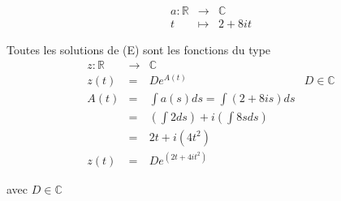 \[\begin{array}{rcl}
	a : \mathbb{R} & \rightarrow & \mathbb{C}\\
t &\mapsto & 2+8it\end{array}\]

Toutes les solutions de (E) sont les fonctions du type \[\begin{array}{rclr}
z : \mathbb{R} &\rightarrow& \mathbb{C}\\
z(t) &=& De^{A(t)} & D \in \mathbb{C}
\\
A(t) &=& \int a(s) ds = \int (2+8is)ds \\
&=& (\int 2ds) + i(\int 8s ds) \\
&=& 2t + i(4t^2) \\
z(t) &=& De^{(2t +4it^2)}
\end{array}\]

avec $D \in \mathbb{C}$
